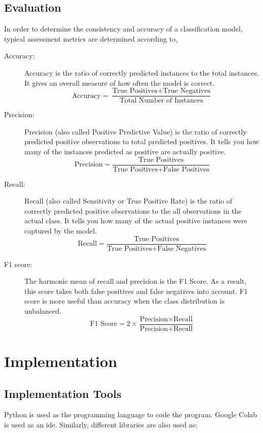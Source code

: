 \clearpage
\subsection{Evaluation}

In order to determine the consistency and accuracy of a classification model, typical assessment metrics are determined according to,

\begin{description}
    \item[Accuracy:] Accuracy is the ratio of correctly predicted instances to the total instances. It gives an overall measure of how often the model is correct.
    $$\text{Accuracy} = \frac{\text{True Positives} + \text{True Negatives}}{\text{Total Number of Instances}}$$

    \item[Precision:] Precision (also called Positive Predictive Value) is the ratio of correctly predicted positive observations to total predicted positives. It tells you how many of the instances predicted as positive are actually positive.
    $$ \text{Precision} = \frac{\text{True Positives}}{\text{True Positives} + \text{False Positives}} $$
    
    \item[Recall:]  Recall (also called Sensitivity or True Positive Rate) is the ratio of correctly predicted positive observations to the all observations in the actual class. It tells you how many of the actual positive instances were captured by the model.
    $$ \text{Recall} = \frac{\text{True Positives}}{\text{True Positives} + \text{False Negatives}} $$

    \item[F1 score:] The harmonic mean of recall and precision is the F1 Score. As a result, this score takes both false positives and false negatives into account. F1 score is more useful than accuracy when the class distribution is unbalanced.
    $$ \text{F1 Score} = 2 \times \frac{\text{Precision} \times \text{Recall}}{\text{Precision} + \text{Recall}} $$
\end{description}
\clearpage

\section{Implementation}

\subsection{Implementation Tools}
Python is used as the programming language to code the program. Google Colab is used as an \ac{ide}. Similarly, different libraries are also used as:

